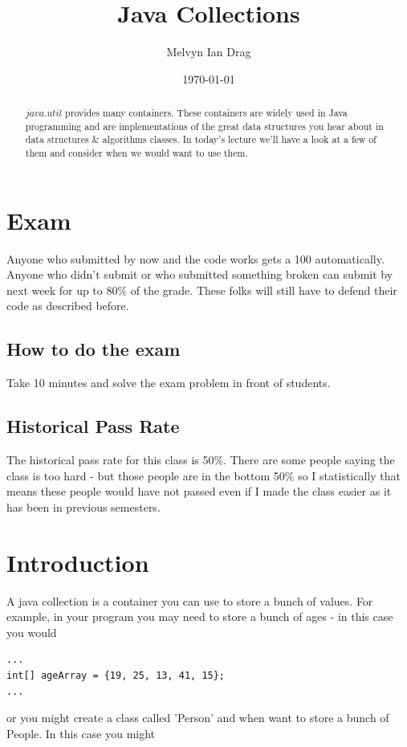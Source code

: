 \documentclass[12pt]{article}
\title{Java Collections}
\author{
	Melvyn Ian Drag
}
\date{\today}
\begin{document}
\maketitle

\begin{abstract}
$java.util$ provides many containers. These containers are widely used in Java programming and are implementations of the great data structures you hear about in data structures \& algorithms classes. In today's lecture we'll have a look at a few of them and consider when we would want to use them.
\end{abstract}

\section{Exam}
Anyone who submitted by now and the code works gets a 100 automatically. Anyone who didn't submit or who submitted something broken can submit by next week for up to 80\% of the grade. These folks will still have to defend their code as described before.

\subsection{How to do the exam}
Take 10 minutes and solve the exam problem in front of students.

\subsection{Historical Pass Rate}
The historical pass rate for this class is 50\%. There are some people saying the class is too hard - but those people are in the bottom 50\% so I statistically that means these people would have not passed even if I made the class easier as it has been in previous semesters.

\section{Introduction}
A java collection is a container you can use to store a bunch of values. For example, in your program you may need to store a bunch of ages - in this case you would

\begin{lstlisting}
...
int[] ageArray = {19, 25, 13, 41, 15};
...
\end{lstlisting} 

or you might create a class called 'Person' and when want to store a bunch of People. In this case you might
\end{document}
